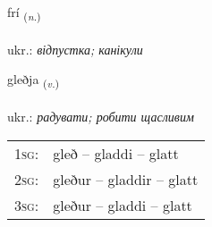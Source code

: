 \documentclass[frontgrid, backgrid]{flacards}\usepackage[]{graphicx}\usepackage[]{xcolor}
\begin{document}
\renewcommand{\flhead}{\vskip5pt \fboxsep=0pt {\small\bfseries\footnotesize Nafnorð | іменник}}
\renewcommand{\fcfoot}{\vskip5pt \fboxsep=0pt \hspace{2pt}{\small\bfseries\footnotesize 2K}}

\renewcommand{\blhead}{\vskip5pt {\small\bfseries\footnotesize Nafnorð | іменник }}
\renewcommand{\bcfoot}{\vskip5pt \hspace{2pt}{\small\bfseries\footnotesize 2K}}


{frí \small{\textsubscript{(\textit{n.})}} \\[1ex] %
\textphonetic{[friː]} \\
ukr.: \emph{відпустка; канікули} \\  [2ex]
\renewcommand*{\arraystretch}{0.8}
}

\renewcommand{\flhead}{\vskip5pt \fboxsep=0pt {\small\bfseries\footnotesize Sagnorð | дієслово}}
\renewcommand{\fcfoot}{\vskip5pt \fboxsep=0pt \hspace{2pt}{\small\bfseries\footnotesize 2K}}

\renewcommand{\blhead}{\vskip5pt {\small\bfseries\footnotesize Sagnorð | дієслово }}
\renewcommand{\bcfoot}{\vskip5pt \hspace{2pt}{\small\bfseries\footnotesize 2K}}


{gleðja \small{\textsubscript{(\textit{v.})}} \\[1ex] %
\textphonetic{[klɛðja]} \\
ukr.: \emph{радувати; робити щасливим} \\  [2ex]
\renewcommand*{\arraystretch}{0.8}
\begin{tabular}{p{1cm}l}
\textsc{1sg}: & gleð -- gladdi -- glatt \\ 
\textsc{2sg}: & gleður -- gladdir -- glatt \\ 
\textsc{3sg}: & gleður -- gladdi -- glatt \\ 
\end{tabular}
}
\end{document}
